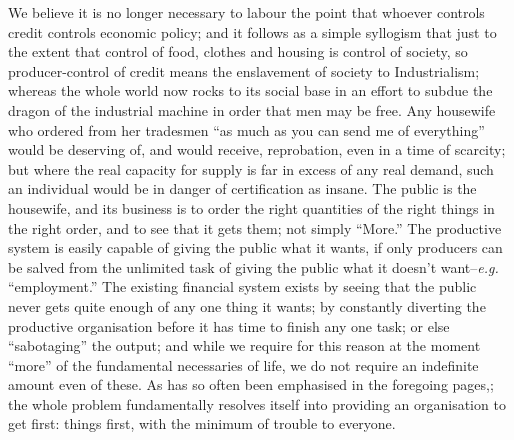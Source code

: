 \documentclass{book}
\begin{document}
We believe it is no longer necessary to labour the point that whoever controls credit controls economic policy; and it follows as a simple syllogism that just to the extent that control of food, clothes and housing is control of society, so producer-control of credit means the enslavement of society to Industrialism; whereas the whole world now rocks to its social base in an effort to subdue the dragon of the industrial machine in order that men may be free. Any housewife who ordered from her tradesmen “as much as you can send me of everything” would be deserving of, and would receive, reprobation, even in a time of scarcity; but where the real capacity for supply is far in excess of any real demand, such an individual would be in danger of certification as insane. The public is the housewife, and its business is to order the right quantities of the right things in the right order, and to see that it gets them; not simply “More.” The productive system is easily capable of giving the public what it wants, if only producers can be salved from the unlimited task of giving the public what it doesn't want–\emph{e.g.} “employment.” The existing financial system exists by seeing that the public never gets quite enough of any one thing it wants; by constantly diverting the productive organisation before it has time to finish any one task; or else “sabotaging” the output; and while we require for this reason at the moment “more” of the fundamental necessaries of life, we do not require an indefinite amount even of these. As has so often been emphasised in the foregoing pages,; the whole problem fundamentally resolves itself into providing an organisation to get first: things first, with the minimum of trouble to everyone.
\end{document}
